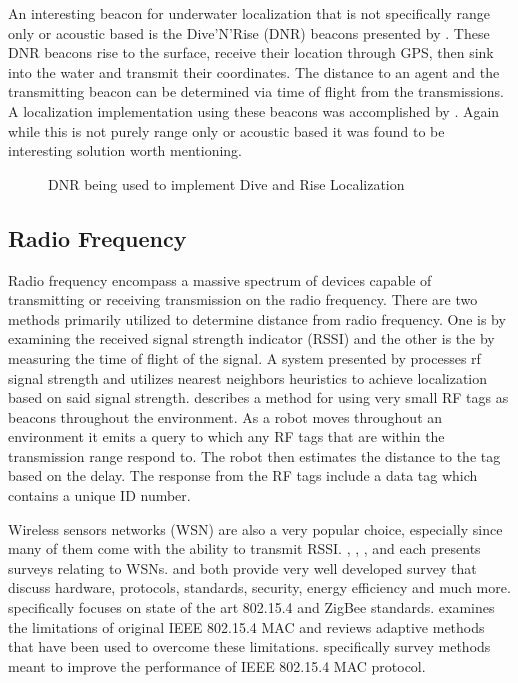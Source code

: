 \documentclass[conference]{IEEEtran}
\begin{document}
	An interesting beacon for underwater localization that is not specifically range only or acoustic based is the Dive'N'Rise (DNR) beacons presented by \cite{Erol2007}. These DNR beacons rise to the surface, receive their location through GPS, then sink into the water and transmit their coordinates. The distance to an agent and the transmitting beacon can be determined via time of flight from the transmissions. A localization implementation using these beacons was accomplished by \cite{Erol2008}. Again while this is not purely range only or acoustic based it was found to be interesting solution worth mentioning.
	
  	\begin{figure}[h!]
	
	\centering
	


	
	\caption{DNR being used to implement Dive and Rise Localization  \cite{Erol-Kantarci2011}}
	
	\label{DNR}
	
\end{figure}


	\subsection{Radio Frequency}
	Radio frequency encompass a massive spectrum of devices capable of transmitting or receiving transmission on the radio frequency. There are two methods primarily utilized to determine distance from radio frequency. One is by examining the received signal strength indicator (RSSI) and the other is the by measuring the time of flight of the signal. A system presented by \cite{Padmanabhan2000} processes rf signal strength and utilizes nearest neighbors heuristics to achieve localization based on said signal strength.  \cite{Kurth2003a} describes a method for using very small RF tags as beacons throughout the environment.  As a robot moves throughout an environment it emits a query to which any RF tags that are within the transmission range respond to. The robot then estimates the distance to the tag based on the delay. The response from the RF tags include a data tag which contains a unique ID number. 
	
	Wireless sensors networks (WSN) are also a very popular choice, especially since many of them come with the ability to transmit RSSI. \cite{Baronti2007}, \cite{Khanafer2014}, \cite{Akyildiz2002}, and \cite{Xia2011} each presents surveys relating to WSNs.  \cite{Baronti2007} and \cite{Akyildiz2002} both provide very well developed survey that discuss hardware, protocols, standards, security, energy efficiency and much more. \cite{Baronti2007} specifically focuses on state of the art 802.15.4 and ZigBee standards. \cite{Xia2011} examines the limitations of original IEEE 802.15.4 MAC and reviews adaptive methods that have been used to overcome these limitations. \cite{Khanafer2014} specifically survey methods meant to improve the performance of IEEE 802.15.4 MAC protocol.
\end{document}
